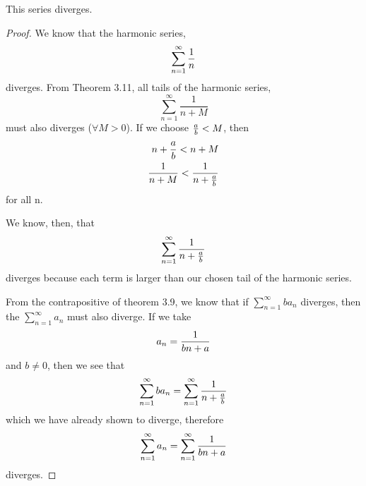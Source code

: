 \documentclass[11pt]{article}
\def \sumtoinfy {\sum_{n=1}^{\infty}}
\begin{document}
This series diverges.
\begin{proof}
We know that the harmonic series, $$\sumtoinfy \harmonic$$ diverges. From Theorem 3.11, all tails of the harmonic series, $$\sumtoinfy \frac{1}{n + M}$$ must also diverges ($ \forall M > 0$). 
If we choose $\frac{a}{b} < M$, then 
\begin{align*}	
	n + \frac{a}{b} < n + M \\
	\frac{1}{n + M} < \frac{1}{n + \frac{a}{b}}
\end{align*} for all n.

We know, then, that $$\sumtoinfy \generalharmonictimesb$$ diverges because each term is larger than our chosen tail of the harmonic series. 

From the contrapositive of theorem 3.9, we know that if $\sumtoinfy ba_n$ diverges, then the $\sumtoinfy a_n$ must also diverge. If we take $$a_n = \frac{1}{bn + a}$$ and $b \ne 0$, then we see that $$\sumtoinfy ba_n = \sumtoinfy \generalharmonictimesb$$ which we have already shown to diverge, therefore $$\sumtoinfy a_n = \sumtoinfy \generalharmonic$$ diverges.
\end{proof}
\end{document}

